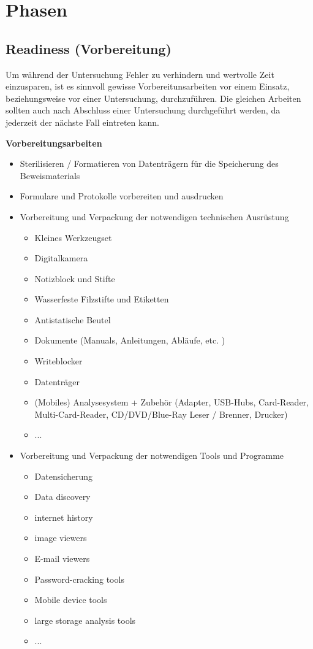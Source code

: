 \section{Phasen}
\subsection{Readiness (Vorbereitung)}
Um während der Untersuchung Fehler zu verhindern und wertvolle Zeit einzusparen, ist es sinnvoll gewisse Vorbereitunsarbeiten vor einem Einsatz, beziehungsweise vor einer Untersuchung, durchzuführen. Die gleichen Arbeiten sollten auch nach Abschluss einer Untersuchung durchgeführt werden, da jederzeit der nächste Fall eintreten kann.

\textbf{Vorbereitungsarbeiten}
\begin{itemize}
\item Sterilisieren / Formatieren von Datenträgern für die Speicherung des Beweismaterials
\item Formulare und Protokolle vorbereiten und ausdrucken
\item Vorbereitung und Verpackung der notwendigen technischen Ausrüstung \\
\begin{itemize}
\item Kleines Werkzeugset
\item Digitalkamera
\item Notizblock und Stifte
\item Wasserfeste Filzstifte und Etiketten
\item Antistatische Beutel
\item Dokumente (Manuals, Anleitungen, Abläufe, etc. )
\item Writeblocker
\item Datenträger
\item (Mobiles) Analysesystem + Zubehör (Adapter, USB-Hubs, Card-Reader, Multi-Card-Reader, CD/DVD/Blue-Ray Leser / Brenner, Drucker)
\item ...
\end{itemize}
\item Vorbereitung und Verpackung der notwendigen Tools und Programme \\
\begin{itemize}
\item Datensicherung 
\item Data discovery
\item internet history
\item image viewers
\item E-mail viewers
\item Password-cracking tools
\item Mobile device tools
\item large storage analysis tools
\item ...
\end{itemize}
\end{itemize}

